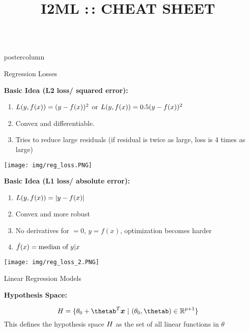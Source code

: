 \documentclass{beamer}
\title{I2ML :\,: CHEAT SHEET} %
\newlength{\columnheight} %
\begin{document}
\begin{frame}[fragile]{}
\begin{columns}
	\begin{column}{.31\textwidth}
		\begin{beamercolorbox}[center]{postercolumn}
			\begin{minipage}{.98\textwidth}
				\parbox[t][\columnheight]{\textwidth}{
					\begin{myblock}{Regression Losses}
						\begin{codebox}
			\textbf{Basic Idea (L2 loss/ squared error):}
						\end{codebox}
						\begin{enumerate}
                        \item $L(y, f(x)) = (y-f(x))^2$ or $L(y, f(x)) = 0.5 (y-f(x))^2$
                        \item Convex and differentiable.
                        \item Tries to reduce large residuals (if residual is twice as large, loss is 4 times as large)      \end{enumerate}
						\hspace*{1ex}
						\texttt{[image: img/reg\_loss.PNG]}
				
						\begin{codebox}
			\textbf{Basic Idea (L1 loss/ absolute error):}
						\end{codebox}
						\begin{enumerate}
                        \item $L(y, f(x)) = |y-f(x)|$
                        \item Convex and more robust
                        \item No derivatives for $ = 0$, $y = f(x)$, optimization becomes harder
                        \item $\hat{f}(x) = \text{median of } y | x$      
                        \end{enumerate}
                        \texttt{[image: img/reg\_loss\_2.PNG]}
					\end{myblock}
					\begin{myblock}{Linear Regression Models}
					
				\begin{codebox} \textbf{Hypothesis Space: }
					\end{codebox}
					\[
                    \Hspace = \{ \theta_0 + \thetab^T \xv\ |\ (\theta_0, \thetab) \in \mathbb{R}^{p+1} \}\]
                This defines the hypothesis space $H$ as the set of all linear functions in $\theta$
					

\end{myblock}}
\end{minipage}
\end{beamercolorbox}
\end{column}
\end{columns}
\end{frame}
\end{document}
